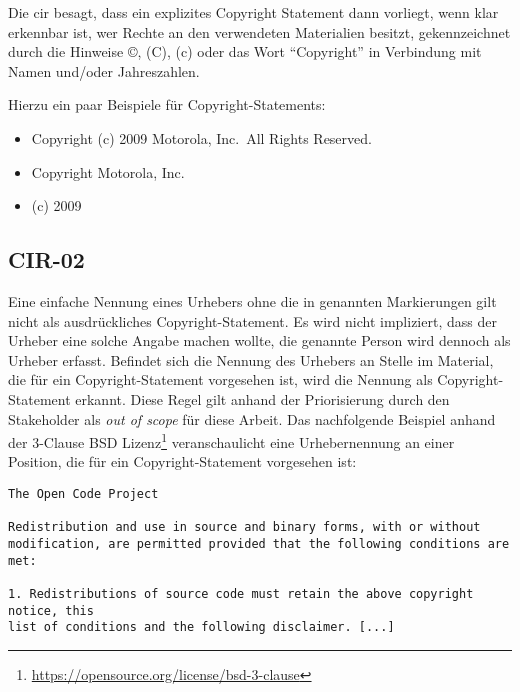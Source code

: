 Die \gls{cir} besagt, dass ein explizites Copyright Statement dann vorliegt, wenn klar erkennbar ist, wer Rechte an den verwendeten Materialien besitzt, gekennzeichnet durch die Hinweise ©, (C), (c) oder das Wort \enquote{Copyright} in Verbindung mit Namen und/oder Jahreszahlen.

Hierzu ein paar Beispiele für Copyright-Statements:
\begin{itemize}
    \item Copyright (c) 2009 Motorola, Inc.\ All Rights Reserved.
    \item Copyright Motorola, Inc.
    \item (c) 2009
\end{itemize}


\subsection{CIR-02}\label{subsec:cir-02}

Eine einfache Nennung eines Urhebers ohne die in  genannten Markierungen gilt nicht als ausdrückliches Copyright-Statement.
Es wird nicht impliziert, dass der Urheber eine solche Angabe machen wollte, die genannte Person wird dennoch als Urheber erfasst.
Befindet sich die Nennung des Urhebers an Stelle im Material, die für ein Copyright-Statement vorgesehen ist, wird die Nennung als Copyright-Statement erkannt.
Diese Regel gilt anhand der Priorisierung durch den Stakeholder als \textit{out of scope} für diese Arbeit.
Das nachfolgende Beispiel anhand der 3-Clause BSD Lizenz\footnote{\url{https://opensource.org/license/bsd-3-clause}} veranschaulicht eine Urhebernennung an einer Position, die für ein Copyright-Statement vorgesehen ist:

\begin{lstlisting}[keepspaces=true]
The Open Code Project

Redistribution and use in source and binary forms, with or without
modification, are permitted provided that the following conditions are met:

1. Redistributions of source code must retain the above copyright notice, this
list of conditions and the following disclaimer. [...]
\end{lstlisting}


